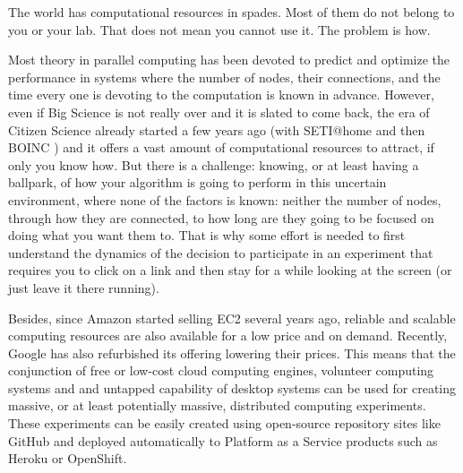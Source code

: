 \documentclass{sig-alternate}
\begin{document}
The world has computational resources in spades. Most of them do not
belong to you or your lab. That does not mean you cannot use it. The
problem is how. 

Most theory in parallel computing has been devoted to predict and
optimize the performance in systems where the number of nodes, their
connections, and the time every one is devoting to the computation is
known in advance. However, even if Big Science is not really over and
it is slated to come back, the era of
Citizen Science already started a few years ago (with SETI@home \cite{david-seti:home} and then BOINC \cite{boinc_grid04}) and it
offers a vast amount of computational resources to attract, if only
you know how. But there is a challenge: knowing, or at least having a
ballpark, of how your algorithm is going to perform in this uncertain
environment, where none of the factors is known: neither the number of
nodes, through how they are connected, to how long are they going to
be focused on doing what you want them to. That is why some effort is
needed to first understand the dynamics of the decision to participate
in an experiment that requires you to click on a link and then stay
for a while looking at the screen (or just leave it there running).

Besides, since Amazon started selling EC2 several years ago, reliable
and scalable computing resources are also available for a low price
and on demand. Recently, Google has also refurbished its offering
lowering their prices. This means that the conjunction of free or
low-cost cloud computing engines, volunteer computing systems and and
untapped capability of desktop systems can be used for creating
massive, or at least potentially massive, distributed computing
experiments. These experiments can be easily created using open-source
repository sites like GitHub and deployed automatically to Platform as
a Service products such as Heroku or OpenShift. 
\end{document}
